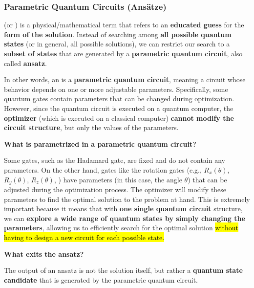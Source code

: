 \subsubsection{Parametric Quantum Circuits (Ansätze)}\label{sec:parametric-quantum-circuits-ansatz}

 (or ) is a physical/mathematical term that refers to an \textbf{educated guess} for the \textbf{form of the solution}. Instead of searching among \textbf{all possible quantum states} (or in general, all possible solutions), we can restrict our search to a \textbf{subset of states} that are generated by a \textbf{parametric quantum circuit}, also called \textbf{ansatz}.

\highspace
In other words, an  is a \textbf{parametric quantum circuit}, meaning a circuit whose behavior depends on one or more adjustable parameters. Specifically, some quantum gates contain parameters that can be changed during optimization. However, since the quantum circuit is executed on a quantum computer, the \textbf{optimizer} (which is executed on a classical computer) \textbf{cannot modify the circuit structure}, but only the values of the parameters.

\highspace
\begin{flushleft}
    \textcolor{Green3}{ \textbf{What is parametrized in a parametric quantum circuit?}}
\end{flushleft}
Some gates, such as the Hadamard gate, are fixed and do not contain any parameters. On the other hand, gates like the rotation gates (e.g., $R_x(\theta)$, $R_y(\theta)$, $R_z(\theta)$, ) have parameters (in this case, the angle $\theta$) that can be adjusted during the optimization process. The optimizer will modify these parameters to find the optimal solution to the problem at hand. This is extremely important because it means that with \textbf{one single quantum circuit} structure, we can \textbf{explore a wide range of quantum states by simply changing the parameters}, allowing us to efficiently search for the optimal solution \hl{without having to design a new circuit for each possible state.}

\highspace
\begin{flushleft}
    \textcolor{Green3}{ \textbf{What exits the ansatz?}}
\end{flushleft}
The output of an ansatz is not the solution itself, but rather a \textbf{quantum state candidate} that is generated by the parametric quantum circuit. 


